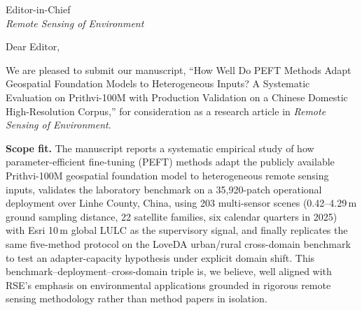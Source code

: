 \documentclass[11pt]{letter}
\begin{document}
\begin{letter}{%
  Editor-in-Chief \\
  \emph{Remote Sensing of Environment} \\
}

\opening{Dear Editor,}

We are pleased to submit our manuscript, ``How Well Do PEFT Methods Adapt Geospatial Foundation Models to Heterogeneous Inputs? A Systematic Evaluation on Prithvi-100M with Production Validation on a Chinese Domestic High-Resolution Corpus,'' for consideration as a research article in \emph{Remote Sensing of Environment}.

\textbf{Scope fit.} The manuscript reports a systematic empirical study of how parameter-efficient fine-tuning (PEFT) methods adapt the publicly available Prithvi-100M geospatial foundation model to heterogeneous remote sensing inputs, validates the laboratory benchmark on a 35{,}920-patch operational deployment over Linhe County, China, using 203 multi-sensor scenes (0.42--4.29\,m ground sampling distance, 22 satellite families, six calendar quarters in 2025) with Esri 10\,m global LULC as the supervisory signal, and finally replicates the same five-method protocol on the LoveDA urban/rural cross-domain benchmark to test an adapter-capacity hypothesis under explicit domain shift. This benchmark--deployment--cross-domain triple is, we believe, well aligned with RSE's emphasis on environmental applications grounded in rigorous remote sensing methodology rather than method papers in isolation.


\end{letter}
\end{document}
